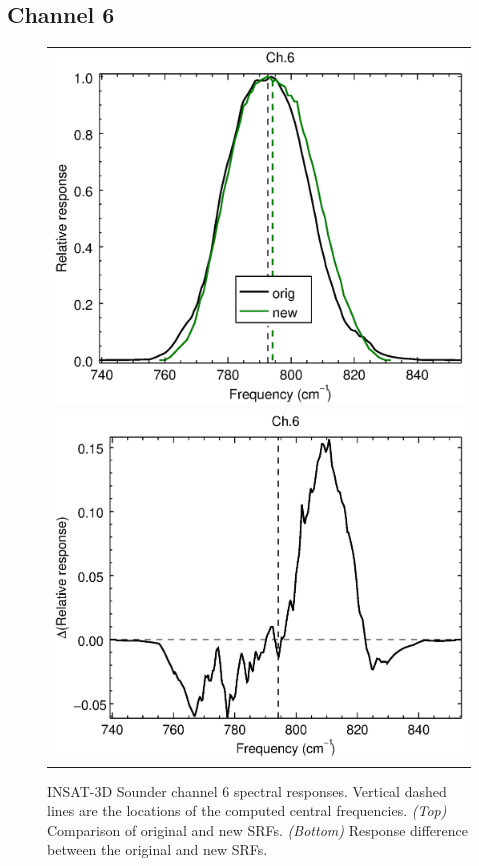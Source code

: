 \subsection{Channel 6}
\begin{figure}[H]
  \centering
  \begin{tabular}{c}
    \includegraphics[scale=0.55]{graphics/sndr/srf/sndr_insat3d-6.eps} \\
    \includegraphics[scale=0.55]{graphics/sndr/srf/sndr_insat3d-6.difference.eps}
  \end{tabular}
  \caption{INSAT-3D Sounder channel 6 spectral responses. Vertical dashed lines are the locations of the computed central frequencies. \emph{(Top)} Comparison of original and new SRFs. \emph{(Bottom)} Response difference between the original and new SRFs.}
  \label{fig:sndr_ch6}
\end{figure}


